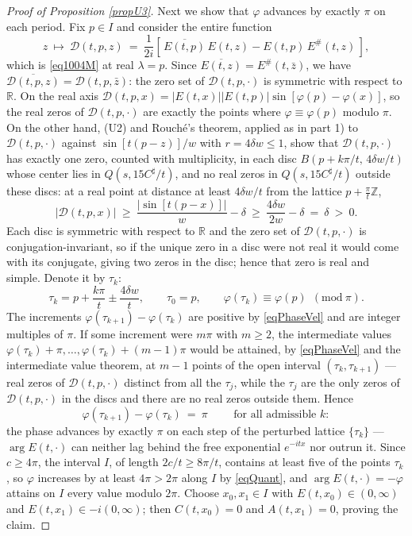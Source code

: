 \documentclass[11pt,twoside,reqno]{amsart}
\def\R{{\mathbb R}}
\def\Z{{\mathbb{Z}}}
\def\d{\delta}
\def\l{\lambda}
\theoremstyle{plain}
\numberwithin{equation}{section}
\begin{document}
\begin{proof}[Proof of Proposition \ref{propU3}]
Next we show that $\varphi$ advances by exactly $\pi$ on each period. Fix $p\in I$ and consider the entire function
$$z\ \mapsto\ {\mathcal D}(t,p,z)\ =\ \frac1{2i}\left[\,\overline{E(t,p)}\,E(t,z)-E(t,p)\,E^\#(t,z)\,\right],$$
which is \eqref{eq1004M} at real $\l=p$. Since $\overline{E(t,z)}=E^\#(t,\bar z)$, we have $\overline{{\mathcal D}(t,p,z)}={\mathcal D}(t,p,\bar z)$: the zero set of ${\mathcal D}(t,p,\cdot)$ is symmetric with respect to $\R$. On the real axis ${\mathcal D}(t,p,x)=|E(t,x)||E(t,p)|\sin[\varphi(p)-\varphi(x)]$, so the real zeros of ${\mathcal D}(t,p,\cdot)$ are exactly the points where $\varphi\equiv\varphi(p)$ modulo $\pi$. On the other hand, (U2) and Rouch\'e's theorem, applied as in part 1) to ${\mathcal D}(t,p,\cdot)$ against $\sin[t(p-z)]/w$ with $r=4\d w\leq1$, show that ${\mathcal D}(t,p,\cdot)$ has exactly one zero, counted with multiplicity, in each disc $B(p+k\pi/t,\,4\d w/t)$ whose center lies in $Q(s,15C^\sharp/t)$, and no real zeros in $Q(s,15C^\sharp/t)$ outside these discs: at a real point at distance at least $4\d w/t$ from the lattice $p+\tfrac\pi t\Z$,
$$\left|{\mathcal D}(t,p,x)\right|\ \geq\ \frac{\left|\sin[t(p-x)]\right|}{w}-\d\ \geq\ \frac{4\d w}{2w}-\d\ =\ \d\ >\ 0 .$$
Each disc is symmetric with respect to $\R$ and the zero set of ${\mathcal D}(t,p,\cdot)$ is conjugation-invariant, so if the unique zero in a disc were not real it would come with its conjugate, giving two zeros in the disc; hence that zero is real and simple. Denote it by $\tau_k$:
$$\tau_k=p+\frac{k\pi}t\pm\frac{4\d w}t,\qquad \tau_0=p,\qquad \varphi(\tau_k)\equiv\varphi(p)\ \ (\mathrm{mod}\ \pi).$$
The increments $\varphi(\tau_{k+1})-\varphi(\tau_k)$ are positive by \eqref{eqPhaseVel} and are integer multiples of $\pi$. If some increment were $m\pi$ with $m\geq2$, the intermediate values $\varphi(\tau_k)+\pi,\dots,\varphi(\tau_k)+(m-1)\pi$ would be attained, by \eqref{eqPhaseVel} and the intermediate value theorem, at $m-1$ points of the open interval $(\tau_k,\tau_{k+1})$ --- real zeros of ${\mathcal D}(t,p,\cdot)$ distinct from all the $\tau_j$, while the $\tau_j$ are the only zeros of ${\mathcal D}(t,p,\cdot)$ in the discs and there are no real zeros outside them. Hence
\begin{equation}
\varphi(\tau_{k+1})-\varphi(\tau_k)\ =\ \pi\qquad\text{ for all admissible }k:
\label{eqQuant}
\end{equation}
the phase advances by exactly $\pi$ on each step of the perturbed lattice $\{\tau_k\}$ --- $\arg E(t,\cdot)$ can neither lag behind the free exponential $e^{-itx}$ nor outrun it. Since $c\geq4\pi$, the interval $I$, of length $2c/t\geq8\pi/t$, contains at least five of the points $\tau_k$, so $\varphi$ increases by at least $4\pi>2\pi$ along $I$ by \eqref{eqQuant}, and $\arg E(t,\cdot)=-\varphi$ attains on $I$ every value modulo $2\pi$. Choose $x_0,x_1\in I$ with $E(t,x_0)\in(0,\infty)$ and $E(t,x_1)\in-i(0,\infty)$; then $C(t,x_0)=0$ and $A(t,x_1)=0$, proving the claim.


\end{proof}
\end{document}
